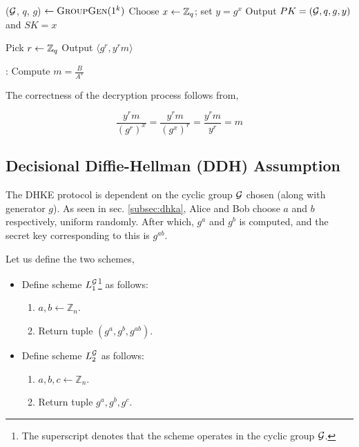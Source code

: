 \begin{algorithmic}
\STATE ($ \mathcal{G} $, $ q $, $ g $) $ \leftarrow \textsc{GroupGen} (1^k) $ 
\STATE Choose $ x \leftarrow \mathbb{Z}_q $; set $ y = g^x $ 
\STATE Output $ PK = ( \mathcal{G}, q, g, y) $ and $ SK = x $ 
\end{algorithmic} 

\smallskip

\begin{algorithmic}
\STATE Pick $ r \leftarrow \mathbb{Z}_q $ 
\STATE Output $ \langle g^r, y^r m \rangle $ 
\end{algorithmic} 

\smallskip

\begin{algorithmic}
:
\STATE Compute $ m = \frac{B}{A^x} $ 
\end{algorithmic}

The correctness of the decryption process follows from,

\begin{equation*}
\frac{y^r m}{(g^r)^x} = \frac{y^r m}{(g^x)^r} = \frac{y^r m }{y^r} = m
\end{equation*}

\subsection{Decisional Diffie-Hellman (DDH) Assumption}

The DHKE protocol is dependent on the cyclic group \( \mathcal{G} \) chosen (along with generator \( g \)).
As seen in sec. \ref{subsec:dhka}, Alice and Bob choose \( a \) and \( b \) respectively, uniform randomly. 
After which, \( g^a \) and \( g^b \) is computed, and the secret key corresponding to this is \( g^{ab} \).

Let us define the two schemes,

\begin{itemize}
    \item Define scheme \( L_1^{\mathcal{G}} \)\footnote{The superscript denotes that the scheme operates in the cyclic group \( \mathcal{G} \).} as follows: 
    \begin{enumerate}
        \item \( a, b \leftarrow \mathbb{Z}_n \).
        \item Return tuple \( (g^a, g^b, g^{ab}) \).
    \end{enumerate}

    \item Define scheme \( L_2^{\mathcal{G}} \) as follows: 
    \begin{enumerate}
        \item \( a, b, c \leftarrow \mathbb{Z}_n \).
        \item Return tuple \( g^a, g^b, g^c \).
    \end{enumerate}
\end{itemize}

